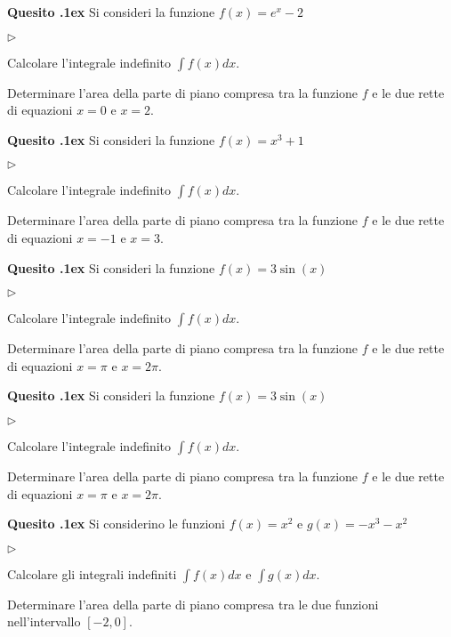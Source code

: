 \documentclass[11pt,twoside,a4paper]{article}
\newcommand{\mylabel}[1]{#1\hfill}
\renewenvironment{itemize}
  {\begin{list}{$\triangleright$}{%
   \setlength{\parskip}{0mm}
   \setlength{\topsep}{.4\baselineskip}
   \setlength{\rightmargin}{0mm}
   \setlength{\listparindent}{0mm}
   \setlength{\itemindent}{0mm}
   \setlength{\labelwidth}{2ex}
   \setlength{\itemsep}{.4\baselineskip}
   \setlength{\parsep}{0mm}
   \setlength{\partopsep}{0mm}
   \setlength{\labelsep}{1ex}
   \setlength{\leftmargin}{\labelwidth+\labelsep}
   \let\makelabel\mylabel}}{%
   \end{list}\vspace*{-1.3mm}}
\newcounter{quesito}
\newenvironment{question}{\bigskip\addtocounter{quesito}{1}\bigskip\bigskip\par\textbf{Quesito \thequesito.\kern1ex}}{\vspace{\parskip}}
\begin{document}
\begin{question}
Si consideri la funzione $f(x) = e^x - 2$
\begin{itemize}
\item[1.] Calcolare l'integrale indefinito $\displaystyle \int f(x) dx$.
\item[2.] Determinare l'area della parte di piano compresa tra la funzione $f$ e le due rette di equazioni $x = 0$ e $x = 2$.
\end{itemize}
\end{question}
\begin{question}
Si consideri la funzione $f(x) = x^3 + 1$
\begin{itemize}
\item[1.] Calcolare l'integrale indefinito $\displaystyle \int f(x) dx$.
\item[2.] Determinare l'area della parte di piano compresa tra la funzione $f$ e le due rette di equazioni $x = -1$ e $x = 3$.
\end{itemize}
\end{question}
\begin{question}
Si consideri la funzione $f(x) = 3\sin(x)$
\begin{itemize}
\item[1.] Calcolare l'integrale indefinito $\displaystyle \int f(x) dx$.
\item[2.] Determinare l'area della parte di piano compresa tra la funzione $f$ e le due rette di equazioni $x = \pi$ e $x = 2 \pi$.
\end{itemize}
\end{question}
\begin{question}
Si consideri la funzione $f(x) = 3\sin(x)$
\begin{itemize}
\item[1.] Calcolare l'integrale indefinito $\displaystyle \int f(x) dx$.
\item[2.] Determinare l'area della parte di piano compresa tra la funzione $f$ e le due rette di equazioni $x = \pi$ e $x = 2 \pi$.
\end{itemize}
\end{question}
\begin{question}
Si considerino le funzioni $f(x) = x^2$ e $g(x) = -x^3 - x^2$
\begin{itemize}
\item[1.] Calcolare gli integrali indefiniti $\displaystyle \int f(x) dx$ e $\displaystyle \int g(x) dx$.
\item[2.] Determinare l'area della parte di piano compresa tra le due funzioni nell'intervallo $[-2, 0]$.
\end{itemize}
\end{question}
\end{document}
